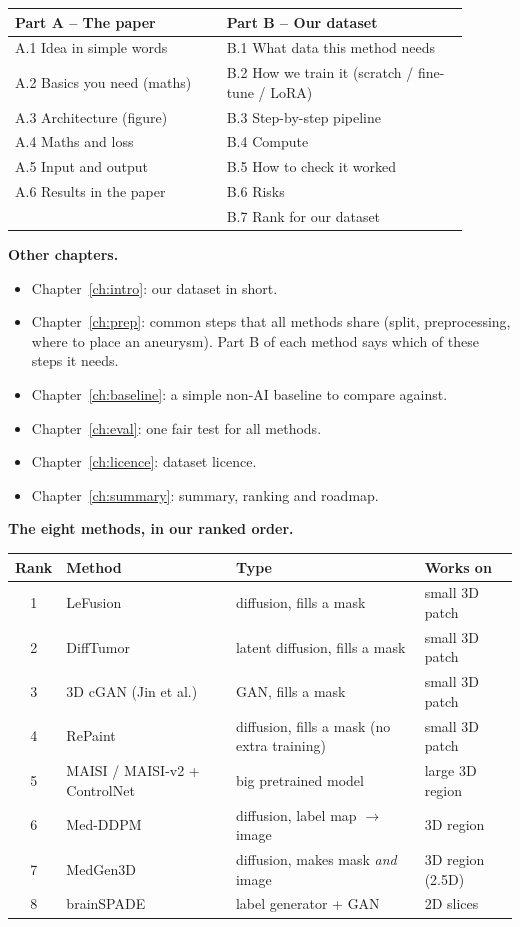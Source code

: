 \documentclass[11pt,a4paper,oneside]{report}
\begin{document}
\begin{center}
\begin{tabular}{p{0.42\linewidth}p{0.48\linewidth}}
\toprule
\textbf{Part A -- The paper} & \textbf{Part B -- Our dataset} \\
\midrule
A.1 Idea in simple words & B.1 What data this method needs \\
A.2 Basics you need (maths) & B.2 How we train it (scratch / fine-tune / LoRA) \\
A.3 Architecture (figure) & B.3 Step-by-step pipeline \\
A.4 Maths and loss & B.4 Compute \\
A.5 Input and output & B.5 How to check it worked \\
A.6 Results in the paper & B.6 Risks \\
 & B.7 Rank for our dataset \\
\bottomrule
\end{tabular}
\end{center}

\textbf{Other chapters.}
\begin{itemize}
  \item Chapter~\ref{ch:intro}: our dataset in short.
  \item Chapter~\ref{ch:prep}: common steps that all methods share (split, preprocessing, where to place an aneurysm). Part B of each method says which of these steps it needs.
  \item Chapter~\ref{ch:baseline}: a simple non-AI baseline to compare against.
  \item Chapter~\ref{ch:eval}: one fair test for all methods.
  \item Chapter~\ref{ch:licence}: dataset licence.
  \item Chapter~\ref{ch:summary}: summary, ranking and roadmap.
\end{itemize}

\textbf{The eight methods, in our ranked order.}
\begin{center}
\small
\begin{tabular}{clll}
\toprule
\textbf{Rank} & \textbf{Method} & \textbf{Type} & \textbf{Works on} \\
\midrule
1 & LeFusion & diffusion, fills a mask & small 3D patch \\
2 & DiffTumor & latent diffusion, fills a mask & small 3D patch \\
3 & 3D cGAN (Jin et al.) & GAN, fills a mask & small 3D patch \\
4 & RePaint & diffusion, fills a mask (no extra training) & small 3D patch \\
5 & MAISI / MAISI-v2 + ControlNet & big pretrained model & large 3D region \\
6 & Med-DDPM & diffusion, label map $\rightarrow$ image & 3D region \\
7 & MedGen3D & diffusion, makes mask \emph{and} image & 3D region (2.5D) \\
8 & brainSPADE & label generator + GAN & 2D slices \\
\bottomrule
\end{tabular}
\end{center}
\end{document}
